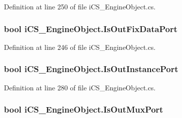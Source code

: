 Definition at line 250 of file i\+C\+S\+\_\+\+Engine\+Object.\+cs.

\hypertarget{classi_c_s___engine_object_a3dd6f89f26ece04f14a47b2764f4337f}{
\subsubsection[{Is\+Out\+Fix\+Data\+Port}]{\setlength{\rightskip}{0pt plus 5cm}bool i\+C\+S\+\_\+\+Engine\+Object.\+Is\+Out\+Fix\+Data\+Port\hspace{0.3cm}{\ttfamily [get]}}}\label{classi_c_s___engine_object_a3dd6f89f26ece04f14a47b2764f4337f}


Definition at line 246 of file i\+C\+S\+\_\+\+Engine\+Object.\+cs.

\hypertarget{classi_c_s___engine_object_a5e5a7c811cc2f00a0b0e47ee6d55b446}{
\subsubsection[{Is\+Out\+Instance\+Port}]{\setlength{\rightskip}{0pt plus 5cm}bool i\+C\+S\+\_\+\+Engine\+Object.\+Is\+Out\+Instance\+Port\hspace{0.3cm}{\ttfamily [get]}}}\label{classi_c_s___engine_object_a5e5a7c811cc2f00a0b0e47ee6d55b446}


Definition at line 280 of file i\+C\+S\+\_\+\+Engine\+Object.\+cs.

\hypertarget{classi_c_s___engine_object_a8ae118e4659fd55529a15546fe28997d}{
\subsubsection[{Is\+Out\+Mux\+Port}]{\setlength{\rightskip}{0pt plus 5cm}bool i\+C\+S\+\_\+\+Engine\+Object.\+Is\+Out\+Mux\+Port\hspace{0.3cm}{\ttfamily [get]}}}\label{classi_c_s___engine_object_a8ae118e4659fd55529a15546fe28997d}


